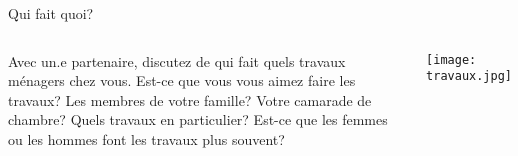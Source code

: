 \begin{frame}{Qui fait quoi?}
  \begin{columns}
      Avec un.e partenaire, discutez de qui fait quels travaux ménagers chez vous.
      Est-ce que vous vous aimez faire les travaux?
      Les membres de votre famille?
      Votre camarade de chambre?
      Quels travaux en particulier?
      Est-ce que les femmes ou les hommes font les travaux plus souvent?
      \begin{center}
        \texttt{[image: travaux.jpg]}
      \end{center}
  \end{columns}
\end{frame}
